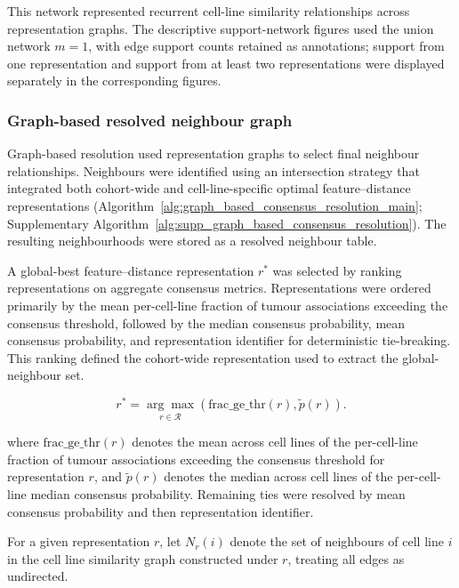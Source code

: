 This network represented recurrent cell-line similarity relationships across
representation graphs. The descriptive support-network figures used the union
network \(m=1\), with edge support counts retained as annotations; support from
one representation and support from at least two representations were displayed
separately in the corresponding figures.


\subsubsection{Graph-based resolved neighbour graph}


Graph-based resolution used representation graphs to select final neighbour
relationships. Neighbours were identified using an intersection strategy that
integrated both cohort-wide and cell-line-specific optimal feature--distance
representations
(Algorithm~\ref{alg:graph_based_consensus_resolution_main};
Supplementary Algorithm~\ref{alg:supp_graph_based_consensus_resolution}). The resulting neighbourhoods
were stored as a resolved neighbour table.

A global-best feature--distance representation \(r^{\ast}\) was selected by
ranking representations on aggregate consensus metrics. Representations were
ordered primarily by the mean per-cell-line fraction of tumour associations
exceeding the consensus threshold, followed by the median consensus probability,
mean consensus probability, and representation identifier for deterministic
tie-breaking. This ranking defined the cohort-wide representation used to extract
the global-neighbour set.

\begin{equation}
    r^{\ast} =
    \underset{r \in \mathcal{R}}{\arg\max}
    \left(
    \mathrm{frac\_ge\_thr}(r),
    \tilde{p}(r)
    \right).
    \label{eq:global-best}
\end{equation}

where \(\mathrm{frac\_ge\_thr}(r)\) denotes the mean across cell lines of the
per-cell-line fraction of tumour associations exceeding the consensus threshold
for representation \(r\), and \(\tilde{p}(r)\) denotes the median across cell
lines of the per-cell-line median consensus probability. Remaining ties were
resolved by mean consensus probability and then representation identifier.

For a given representation \(r\), let \(N_r(i)\) denote the set
of neighbours of cell line $i$ in the cell line similarity graph
constructed under $r$, treating all edges as undirected.

